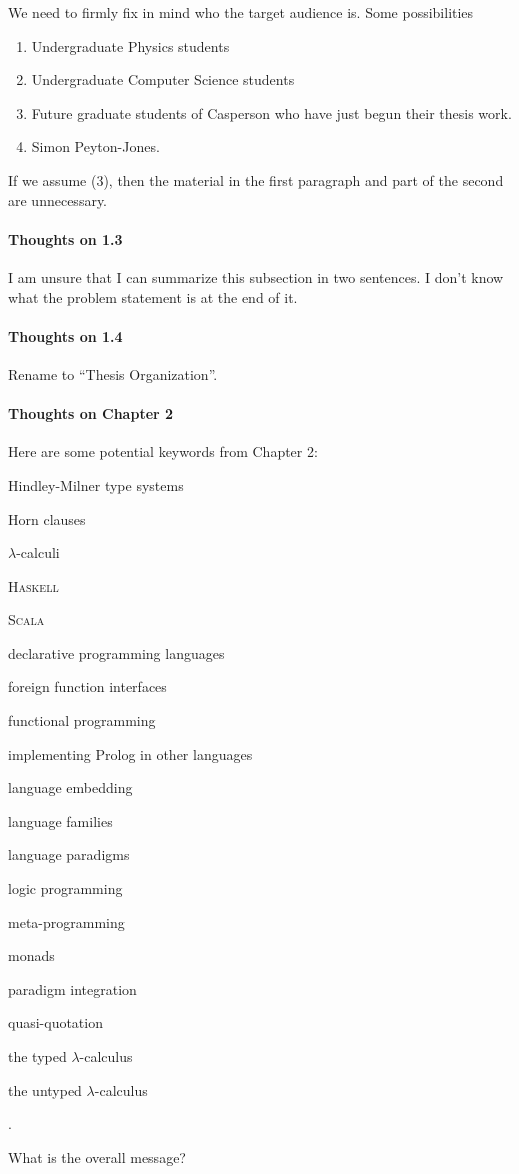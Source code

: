 \begin{scope}
We need to firmly fix in mind who the target audience is.  Some
possibilities
\begin{enumerate}
\item Undergraduate Physics students
\item Undergraduate Computer Science students
\item
  Future graduate students of Casperson who have just begun their
  thesis work.
\item
  Simon Peyton-Jones.
\end{enumerate}
If we assume (3), then the material in the first paragraph and part of
the second are unnecessary.

\paragraph{Thoughts on 1.3}

I am unsure that I can summarize this subsection in two sentences.  I
don't know what the problem statement is at the end of it.

\paragraph{Thoughts on 1.4}

Rename to ``Thesis Organization''.

\paragraph{Thoughts on Chapter 2}

Here are some potential keywords from Chapter 2:
\begin{inparaitem}
\item Hindley-Milner type systems
\item Horn clauses
\item \(\lambda\)-calculi
\item \textsc{Haskell}
\item \textsc{Scala}
\item declarative programming languages
\item foreign function interfaces
\item functional programming
\item implementing Prolog in other languages
\item language embedding
\item language families
\item language paradigms
\item logic programming
\item meta-programming
\item monads
\item paradigm integration
\item quasi-quotation
\item the typed \(\lambda\)-calculus
\item the untyped \(\lambda\)-calculus
\end{inparaitem}.

What is the overall message?


\end{scope}
